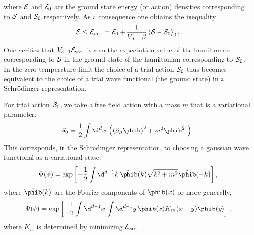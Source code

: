 where  ${\cal E}$  and  ${\cal E}_0$ are the ground state energy (or action) densities  corresponding to ${\cal S}$ and ${\cal S}_0$ respectively.
As a consequence  one obtains the  inequality
$$  {\cal E}
  \le {\cal E}_{\rm var.}={\cal E}_0 +{1\over V_{d-1} \beta  } \left<  {\cal S}-{\cal S}_0\right>_0 ,$$
One verifies that $V_{d-1} {\cal E}_{\rm var.}$ is also the expectation value
of the hamiltonian corresponding to ${\cal S}$ in the ground state of the
hamiltonian corresponding to ${\cal S}_0$.
In the zero temperature limit   the choice of a trial action ${\cal
S}_0$  thus becomes equivalent to the choice of a trial wave
functional (the ground state) in a Schr\"odinger representation.\par
For trial action  ${\cal S}_0$, we take a free field action with a mass
$m$ that is a variational parameter:
$$  {\cal S}_0={1\over2}\int \d^ d x \,
 \left( {(\partial_{\mu} \phib)}^2 +
 m^2   \phib^2 ~\right)  . $$
This corresponds, in the Schr\"odinger representation, to choosing a gaussian wave functional as a variational state:
$$\Psi(\phi)=\exp\left[-{1\over2}\int\d^{d-1}k\,  \tilde \phib(k)  \sqrt{k^2+m^2} \tilde\phib(-k)\right],$$
where $\tilde \phib(k)$ are the Fourier components of $\phib(x)$  or
more generally,
$$\Psi(\phi)=\exp\left[-{1\over2}\int\d^{d-1}x \,\int\d^{d-1}y\, \phib(x) K _m(x-y)\phib(y)\right],$$
where $K _m$ is determined by minimizing ${\cal E}_{\rm var.}$
\rJaStr .\par


